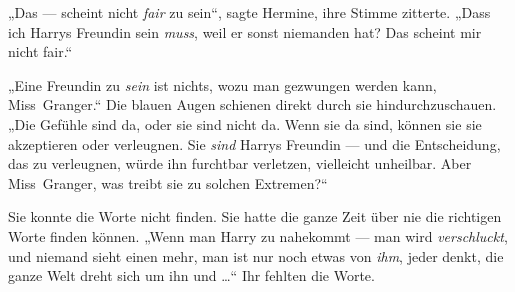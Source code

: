 „Das — scheint nicht \emph{fair} zu sein“, sagte Hermine, ihre Stimme zitterte.
„Dass ich Harrys Freundin sein \emph{muss}, weil er sonst niemanden hat? Das scheint mir nicht fair.“

„Eine Freundin zu \emph{sein} ist nichts, wozu man gezwungen werden kann, Miss~Granger.“ Die blauen Augen schienen direkt durch sie hindurchzuschauen.
„Die Gefühle sind da, oder sie sind nicht da. Wenn sie da sind, können sie sie akzeptieren oder verleugnen. Sie \emph{sind} Harrys Freundin — und die Entscheidung, das zu verleugnen, würde ihn furchtbar verletzen, vielleicht unheilbar. Aber Miss~Granger, was treibt sie zu solchen Extremen?“

Sie konnte die Worte nicht finden. Sie hatte die ganze Zeit über nie die richtigen Worte finden können.
„Wenn man Harry zu nahekommt — man wird \emph{verschluckt}, und niemand sieht einen mehr, man ist nur noch etwas von \emph{ihm}, jeder denkt, die ganze Welt dreht sich um ihn und …“ Ihr fehlten die Worte.

